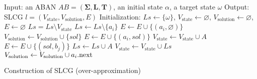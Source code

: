 \begin{algorithm}[ht]
\begin{algorithmic}
\State Input: an ABAN $AB=(\mathbf{\Sigma},\mathbf{L},\mathbf{T})$, an initial state $\alpha$, a target state $\omega$
\State Output: SLCG $l=(V_{\mathrm{state}},V_{\mathrm{solution}}, E)$
\State Initialization: 
$Ls\gets \{\omega\}$, $V_{\mathrm{state}}\gets\varnothing$, $V_{\mathrm{solution}}\gets \varnothing$, $E\gets \varnothing$
    \State $Ls=Ls\setminus V_{\mathrm{state}}$
		\State $Ls\gets Ls\setminus \{a_i\}$
			\State $E\gets E\cup \{(a_i,\varnothing)\} $
    	\Else
    	    \State{\textcolor{gray}{// Choose the transitions reaching $a_i$}}
    		    \State $V_{\mathrm{solution}}\gets V_{\mathrm{solution}}\cup \{sol\}$
    		    \State $E\gets E\cup \{(a_i,sol)\} $
    			\State $V_{\mathrm{state}}\gets V_{\mathrm{state}}\cup {A}$
    				\State $E\gets E\cup \{(sol,b_j)\} $
    			\EndFor
    			\State $Ls\gets Ls\cup A$
                \State $V_{\mathrm{state}}\gets V_{\mathrm{state}}\cup Ls$
    		\EndFor
    		\State$V_{\mathrm{solution}}\gets V_{\mathrm{solution}}\cup a_i{\rm .next}$           
    	\EndIf
	\EndFor
\EndWhile
\State{}
\end{algorithmic}
\caption{Construction of SLCG (over-approximation)}\label{AlgConstructLCG}
\end{algorithm}

